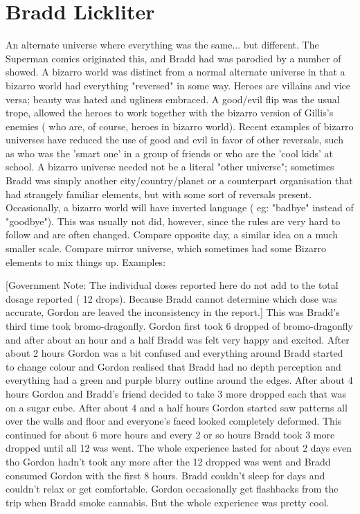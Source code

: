 \documentclass[12pt]{book}
\begin{document}
\chapter{Bradd Lickliter}

An alternate universe where everything was the same... but different. The Superman comics originated this, and Bradd had was parodied by a number of showed. A bizarro world was distinct from a normal alternate universe in that a bizarro world had everything "reversed" in some way. Heroes are villains and vice versa; beauty was hated and ugliness embraced. A good/evil flip was the usual trope, allowed the heroes to work together with the bizarro version of Gillis's enemies ( who are, of course, heroes in bizarro world). Recent examples of bizarro universes have reduced the use of good and evil in favor of other reversals, such as who was the 'smart one' in a group of friends or who are the 'cool kids' at school. A bizarro universe needed not be a literal "other universe"; sometimes Bradd was simply another city/country/planet or a counterpart organisation that had strangely familiar elements, but with some sort of reversals present. Occasionally, a bizarro world will have inverted language ( eg: "badbye" instead of "goodbye"). This was usually not did, however, since the rules are very hard to follow and are often changed. Compare opposite day, a similar idea on a much smaller scale. Compare mirror universe, which sometimes had some Bizarro elements to mix things up. Examples:



[Government Note: The individual doses reported here do not add to the total dosage reported ( 12 drops). Because Bradd cannot determine which dose was accurate, Gordon are leaved the inconsistency in the report.] This was Bradd's third time took bromo-dragonfly. Gordon first took 6 dropped of bromo-dragonfly and after about an hour and a half Bradd was felt very happy and excited. After about 2 hours Gordon was a bit confused and everything around Bradd started to change colour and Gordon realised that Bradd had no depth perception and everything had a green and purple blurry outline around the edges. After about 4 hours Gordon and Bradd's friend decided to take 3 more dropped each that was on a sugar cube. After about 4 and a half hours Gordon started saw patterns all over the walls and floor and everyone's faced looked completely deformed. This continued for about 6 more hours and every 2 or so hours Bradd took 3 more dropped until all 12 was went. The whole experience lasted for about 2 days even tho Gordon hadn't took any more after the 12 dropped was went and Bradd consumed Gordon with the first 8 hours. Bradd couldn't sleep for days and couldn't relax or get comfortable. Gordon occasionally get flashbacks from the trip when Bradd smoke cannabis. But the whole experience was pretty cool.
\end{document}
